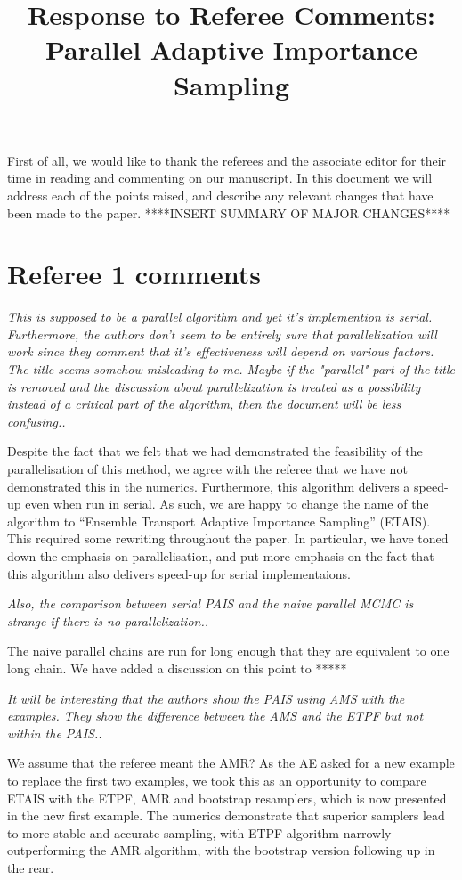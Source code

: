 \documentclass{article}
\newcommand{\comment}[2]{\vspace{0.6cm}{\bf Comment:} {\it #1.}

\vspace{0.3cm}{\bf Answer:} #2}
\begin{document}
\title{Response to Referee Comments: Parallel Adaptive Importance Sampling}
\maketitle
First of all, we would like to thank the referees and the associate editor for
their time in reading and commenting on our manuscript. In this document
we will address each of the points raised, and describe any relevant
changes that have been made to the paper. ****INSERT SUMMARY OF MAJOR CHANGES****

\section*{Referee 1 comments}

\comment{This is supposed to be a parallel algorithm and yet it's implemention is serial. Furthermore, the authors don't seem to be entirely sure that parallelization will work since they comment that it's effectiveness will depend on various factors. The title seems somehow misleading to me. Maybe if the "parallel" part of the title is removed and the discussion about parallelization is treated as a possibility instead of a critical part of the algorithm, then the document will be less confusing.}{Despite the fact that we felt that we had demonstrated the feasibility of the parallelisation of this method, we agree with the referee that we have not demonstrated this in the numerics. Furthermore, this algorithm delivers a speed-up even when run in serial. As such, we are happy to change the name of the algorithm to ``Ensemble Transport Adaptive Importance Sampling'' (ETAIS). This required some rewriting throughout the paper. In particular, we have toned down the emphasis on parallelisation, and put more emphasis on the fact that this algorithm also delivers speed-up for serial implementaions.}

\comment{Also, the comparison between serial PAIS and the naive parallel MCMC is strange if there is no parallelization.}{The naive parallel chains are run for long enough that they are equivalent to one long chain. We have added a discussion on this point to *****}

\comment{It will be interesting that the authors show the PAIS using AMS with the examples. They show the difference between the AMS and the ETPF but not within the PAIS.}{We assume that the referee meant the AMR? As the AE asked for a new example to replace the first two examples, we took this as an opportunity to compare ETAIS with the ETPF, AMR and bootstrap resamplers, which is now presented in the new first example. The numerics demonstrate that superior samplers lead to more stable and accurate sampling, with ETPF algorithm narrowly outperforming the AMR algorithm, with the bootstrap version following up in the rear.}
\end{document}
